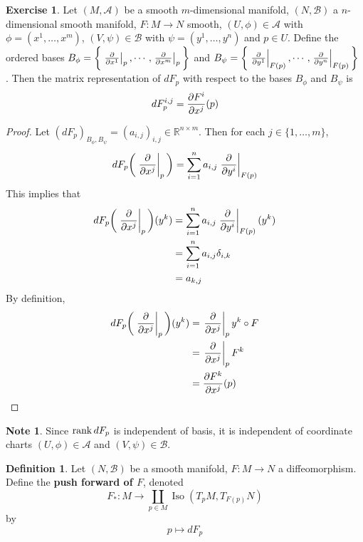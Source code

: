\documentclass[12pt]{amsart}
\theoremstyle{definition}
\newtheorem{defn}[definition]{Definition}
\newtheorem{note}[definition]{Note}
\newtheorem{ex}[definition]{Exercise}
\newcommand{\del}{\delta}
\newcommand{\R}{\mathbb{R}}
\newcommand{\MA}{\mathcal{A}}
\newcommand{\MB}{\mathcal{B}}
\DeclareMathOperator{\iso}{Iso}
\begin{document}
	\begin{ex}
		Let $(M, \MA)$ be a smooth $m$-dimensional manifold, $(N, \MB)$ a $n$-dimensional smooth manifold, $F: M \rightarrow N$ smooth, $(U, \phi) \in \MA$ with $\phi = (x^1, \dots, x^m)$, $(V, \psi) \in \MB$ with $\psi = (y^1, \dots, y^n)$  and $p \in U$. Define the ordered bases $B_\phi = \bigg \{\eval{\pdv{x^1}}_{p}, \cdots, \eval{\pdv{x^m}}_{p} \bigg \}$ and $B_{\psi} = \bigg \{\eval{\pdv{y^1}}_{F(p)}, \cdots, \eval{\pdv{y^n}}_{F(p)} \bigg \}$ .
		Then the matrix representation of $dF_p$ with respect to the bases
		$B_{\phi}$ and $B_{\psi}$ is $$ dF_p^{i,j} =  {\pdv{F^i}{x^j}}(p)$$
	\end{ex}

	\begin{proof}
		Let $(dF_p)_{B_\phi, B_{\psi}} = (a_{i,j})_{i,j} \in \R^{n \times m}$. Then for each $j \in \{1, \dots, m\}$, $$dF_p \bigg(\eval{\pdv{x^j}}_p\bigg) = \sum_{i=1}^n a_{i,j}\eval{ \pdv{y^i}}_{F(p)}$$
		This implies that 
		\begin{align*}
			dF_p \bigg(\eval{\pdv{x^j}}_p\bigg) (y^k )
			&=   \sum_{i=1}^n a_{i,j}\eval{ \pdv{y^i}}_{F(p)} (y^k) \\
			&= \sum_{i=1}^n a_{i,j} \del_{i,k} \\
			&= a_{k, j}
		\end{align*}
		By definition, 
		\begin{align*}
			dF_p \bigg(\eval{\pdv{x^j}}_p\bigg) (y^k )
			&=  \eval{\pdv{x^j}}_p y^k \circ F \\
			&= \eval{\pdv{x^j}}_p F^k \\
			&= {\pdv{F^k}{x^j}}(p)
		\end{align*}
	\end{proof}
	
	
	\begin{note}
	Since $\rank dF_p$ is independent of basis, it is independent of coordinate charts $(U, \phi) \in \MA$ and $(V, \psi) \in \MB$. 
	\end{note}	
	
	
	
	

	\newpage

	\begin{defn}
		Let $(N, \MB)$ be a smooth manifold, $F: M \rightarrow N$ a diffeomorphism. Define the \textbf{push forward of $F$}, denoted $$F_*:M \rightarrow \coprod_{p \in M} \iso(T_pM, T_{F(p)}N)$$ by $$p \mapsto dF_p$$
	\end{defn}
	
	
\end{document}
